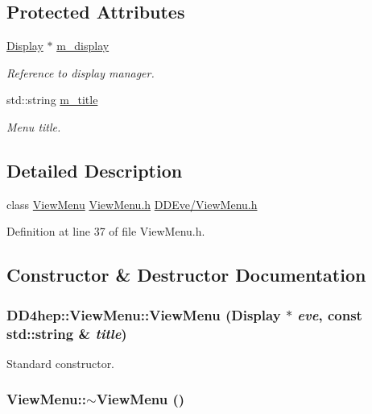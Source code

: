 \subsection*{Protected Attributes}
\begin{DoxyCompactItemize}
\item 
\hyperlink{class_d_d4hep_1_1_display}{Display} $\ast$ \hyperlink{class_d_d4hep_1_1_view_menu_ac7a1b305e90ceedc0b6294389843473e}{m\_\-display}
\begin{DoxyCompactList}\small\item\em Reference to display manager. \item\end{DoxyCompactList}\item 
std::string \hyperlink{class_d_d4hep_1_1_view_menu_a1562e57c30d77349a81e1d6e93918293}{m\_\-title}
\begin{DoxyCompactList}\small\item\em Menu title. \item\end{DoxyCompactList}\end{DoxyCompactItemize}


\subsection{Detailed Description}
class \hyperlink{class_d_d4hep_1_1_view_menu}{ViewMenu} \hyperlink{_view_menu_8h}{ViewMenu.h} \hyperlink{_view_menu_8h}{DDEve/ViewMenu.h} 

Definition at line 37 of file ViewMenu.h.

\subsection{Constructor \& Destructor Documentation}
\hypertarget{class_d_d4hep_1_1_view_menu_a94db1dcf6c0d83d0c31f03f3817f530f}{
\subsubsection[{ViewMenu}]{\setlength{\rightskip}{0pt plus 5cm}DD4hep::ViewMenu::ViewMenu ({\bf Display} $\ast$ {\em eve}, \/  const std::string \& {\em title})}}
\label{class_d_d4hep_1_1_view_menu_a94db1dcf6c0d83d0c31f03f3817f530f}


Standard constructor. \hypertarget{class_d_d4hep_1_1_view_menu_ad36eb8eac44790e3b64f1cce2c048c28}{
\subsubsection[{$\sim$ViewMenu}]{\setlength{\rightskip}{0pt plus 5cm}ViewMenu::$\sim$ViewMenu ()}}
\label{class_d_d4hep_1_1_view_menu_ad36eb8eac44790e3b64f1cce2c048c28}


